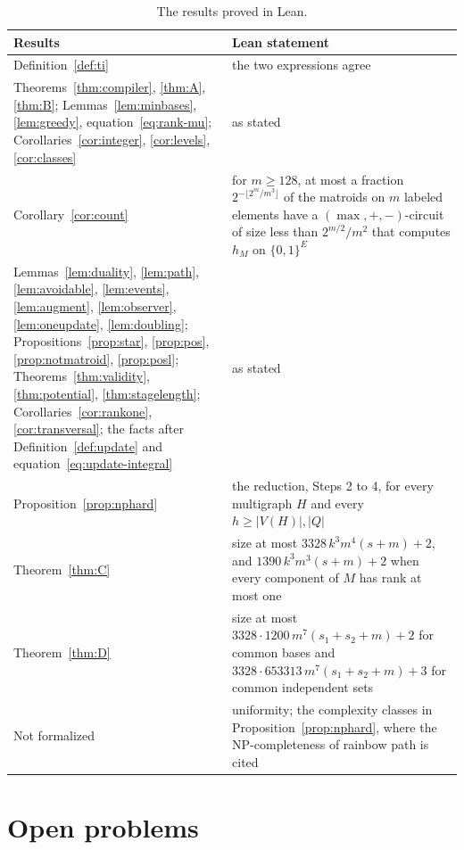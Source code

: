 \documentclass[11pt]{article}
\begin{document}
\begin{table}[ht]
  \centering
  \caption{The results proved in Lean.}
  \label{tab:lean}
  \renewcommand{\arraystretch}{1.25}
  \begin{tabular}{@{}>{\raggedright\arraybackslash}p{}
                  >{\raggedright\arraybackslash}p{}@{}}
    \toprule
    Results & Lean statement\\
    \midrule
    Definition~\ref{def:ti} & the two expressions agree\\
    Theorems~\ref{thm:compiler}, \ref{thm:A}, \ref{thm:B}; Lemmas~\ref{lem:minbases},
    \ref{lem:greedy}, equation~\eqref{eq:rank-mu}; Corollaries~\ref{cor:integer},
    \ref{cor:levels}, \ref{cor:classes} & as stated\\
    Corollary~\ref{cor:count} & for $m\ge128$, at most a fraction
    $2^{-\lfloor2^{m}/m^{3}\rfloor}$ of the matroids on $m$ labeled elements have a
    $(\max,+,-)$-circuit of size less than $2^{m/2}/m^{2}$ that computes $h_M$ on
    $\{0,1\}^{E}$\\
    Lemmas~\ref{lem:duality}, \ref{lem:path}, \ref{lem:avoidable}, \ref{lem:events},
    \ref{lem:augment}, \ref{lem:observer}, \ref{lem:oneupdate}, \ref{lem:doubling};
    Propositions~\ref{prop:star}, \ref{prop:pos}, \ref{prop:notmatroid},
    \ref{prop:posl}; Theorems~\ref{thm:validity}, \ref{thm:potential},
    \ref{thm:stagelength}; Corollaries~\ref{cor:rankone}, \ref{cor:transversal}; the
    facts after Definition~\ref{def:update} and equation~\eqref{eq:update-integral}
    & as stated\\
    Proposition~\ref{prop:nphard} & the reduction, Steps 2 to 4, for every
    multigraph $H$ and every $h\ge|V(H)|,|Q|$\\
    Theorem~\ref{thm:C} & size at most $3328\,k^{3}m^{4}(s+m)+2$, and
    $1390\,k^{3}m^{3}(s+m)+2$ when every component of $M$ has rank at most one\\
    Theorem~\ref{thm:D} & size at most $3328\cdot1200\,m^{7}(s_1+s_2+m)+2$ for common
    bases and $3328\cdot653313\,m^{7}(s_1+s_2+m)+3$ for common independent sets\\
    \midrule
    Not formalized & uniformity; the complexity classes in
    Proposition~\ref{prop:nphard}, where the NP-completeness of rainbow path is
    cited\\
    \bottomrule
  \end{tabular}
\end{table}
\FloatBarrier

\section{Open problems}
\label{sec:scope}
\end{document}
